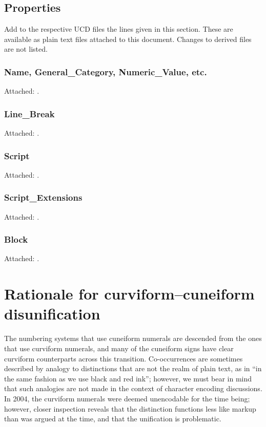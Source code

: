 \documentclass[10pt, a4paper, twoside]{article}
\begin{document}
\subsection{Properties}
\label{properties}
Add to the respective UCD files the lines given in this section.
These are available as plain text files attached to this document.
Changes to derived files are not listed.
\subsubsection{Name, General\_Category, Numeric\_Value, etc.}
Attached: .
\subsubsection{Line\_Break}
Attached: .
\subsubsection{Script}
Attached: .
\subsubsection{Script\_Extensions}
Attached: .
\subsubsection{Block}
Attached: .

\section{Rationale for curviform--cuneiform disunification}
\label{disunificationRationale}
The numbering systems that use cuneiform numerals are descended from the ones that use curviform numerals,
and many of the cuneiform signs have clear curviform counterparts across this transition.
Co-occurrences are sometimes described by analogy to distinctions that are not the realm of plain text,
as in \cite[215]{Powell1972} ``in the same fashion as we use black and red ink'';
however, we must bear in mind that such analogies are not made in the context of character encoding discussions.
In 2004, the curviform numerals were deemed unencodable for the time being; however,
closer inspection reveals that the distinction functions less like markup than was argued at the time,
and that the unification is problematic.
\end{document}
